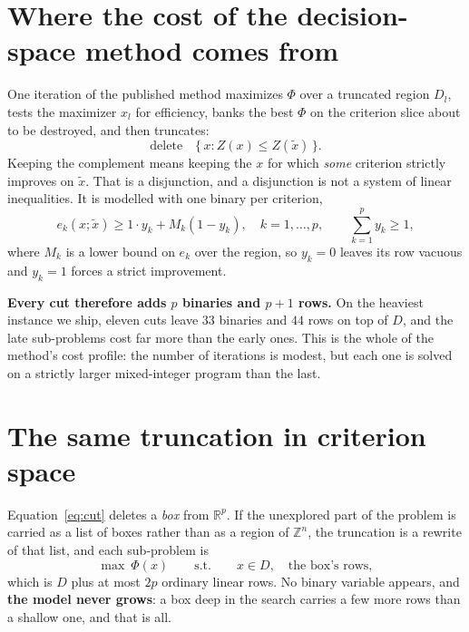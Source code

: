 \documentclass[11pt,a4paper]{article}
\newcommand{\Z}{Z}
\newcommand{\Dset}{D}
\newcommand{\R}{\mathbb{R}}
\newcommand{\Zint}{\mathbb{Z}}
\begin{document}
\section{Where the cost of the decision-space method comes from}

One iteration of the published method maximizes $\Phi$ over a truncated region
$\Dset_l$, tests the maximizer $x_l$ for efficiency, banks the best $\Phi$ on
the criterion slice about to be destroyed, and then truncates:
\begin{equation}\label{eq:cut}
  \text{delete} \quad \{\, x : \Z(x) \leqslant \Z(\tilde{x}) \,\} .
\end{equation}
Keeping the complement means keeping the $x$ for which \emph{some} criterion
strictly improves on $\tilde{x}$. That is a disjunction, and a disjunction is
not a system of linear inequalities. It is modelled with one binary per
criterion,
\begin{equation}\label{eq:bigM}
  e_k(x;\tilde{x}) \geqslant 1 \cdot y_k + M_k (1 - y_k), \quad k = 1,\dots,p,
  \qquad \sum_{k=1}^{p} y_k \geqslant 1 ,
\end{equation}
where $M_k$ is a lower bound on $e_k$ over the region, so $y_k = 0$ leaves its
row vacuous and $y_k = 1$ forces a strict improvement.

\textbf{Every cut therefore adds $p$ binaries and $p+1$ rows.} On the heaviest
instance we ship, eleven cuts leave $33$ binaries and $44$ rows on top of
$\Dset$, and the late sub-problems cost far more than the early ones. This is
the whole of the method's cost profile: the number of iterations is modest, but
each one is solved on a strictly larger mixed-integer program than the last.

\section{The same truncation in criterion space}

Equation~\eqref{eq:cut} deletes a \emph{box} from $\R^p$. If the unexplored
part of the problem is carried as a list of boxes rather than as a region of
$\Zint^n$, the truncation is a rewrite of that list, and each sub-problem is
\begin{equation}\label{eq:sub}
  \max \ \Phi(x) \qquad \text{s.t.} \qquad x \in \Dset, \quad \text{the box's rows},
\end{equation}
which is $\Dset$ plus at most $2p$ ordinary linear rows. No binary variable
appears, and \textbf{the model never grows}: a box deep in the search carries a
few more rows than a shallow one, and that is all.
\end{document}
